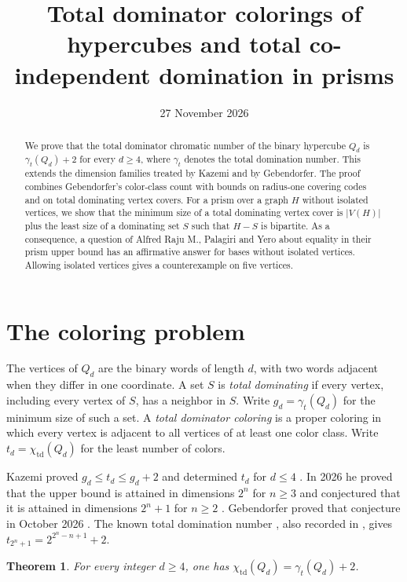 \documentclass[11pt,a4paper]{article}
\title{Total dominator colorings of hypercubes and total co-independent domination in prisms}
\author{}
\date{27 November 2026}
\newtheorem{theorem}{Theorem}
\newcommand{\td}{\chi_{\mathrm{td}}}
\begin{document}
\maketitle
\begin{abstract}
We prove that the total dominator chromatic number of the binary
hypercube $Q_d$ is $\gamma_t(Q_d)+2$ for every $d\ge4$, where $\gamma_t$
denotes the total domination number. This extends the dimension families
treated by Kazemi and by Gebendorfer. The proof combines Gebendorfer's
color-class count with bounds on radius-one covering codes and on
total dominating vertex covers. For a prism over a graph $H$ without
isolated vertices, we show that the minimum size of a total dominating
vertex cover is $|V(H)|$ plus the least size of a dominating set $S$
such that $H-S$ is bipartite. As a consequence, a question of Alfred Raju M.,
Palagiri and Yero about equality in their prism upper bound has an
affirmative answer for bases without isolated vertices. Allowing isolated
vertices gives a counterexample on five vertices.
\end{abstract}

\section{The coloring problem}

The vertices of $Q_d$ are the binary words of length $d$, with two words
adjacent when they differ in one coordinate. A set $S$ is \emph{total
dominating} if every vertex, including every vertex of $S$, has a neighbor in
$S$. Write $g_d=\gamma_t(Q_d)$ for the minimum size of such a set. A
\emph{total dominator coloring} is a proper coloring in which every vertex is
adjacent to all vertices of at least one color class. Write $t_d=\td(Q_d)$
for the least number of colors.

Kazemi proved $g_d\le t_d\le g_d+2$ and determined $t_d$ for $d\le4$
\cite[Propositions 4.3 and 4.9]{kazemi14}. In 2026 he proved that the
upper bound is attained in dimensions $2^n$ for $n\ge3$ and conjectured
that it is attained in dimensions $2^n+1$ for $n\ge2$
\cite[Theorem 5.1 and Conjecture 6.1]{kazemi26}.
Gebendorfer proved that conjecture in October 2026
\cite[Theorem 4.3]{geben}. The known total domination number
\cite[Corollary 13]{prisms}, also recorded in \cite[Theorem 1.3]{kazemi26}, gives
$t_{2^n+1}=2^{2^n-n+1}+2$.

\begin{theorem}\label{thm:main}
For every integer $d\ge4$, one has $\td(Q_d)=\gamma_t(Q_d)+2$.
\end{theorem}
\end{document}
